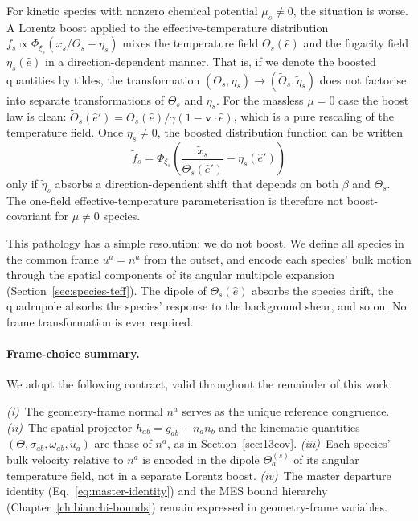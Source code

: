 For kinetic species with nonzero chemical potential
$\mu_s \neq 0$, the situation is worse.  A Lorentz boost
applied to the effective-temperature distribution
$f_s \propto \Phi_{\xi_s}(x_s/\Theta_s - \eta_s)$
mixes the temperature field $\Theta_s(\hat{e})$ and the
fugacity field $\eta_s(\hat{e})$ in a
direction-dependent manner.  That is, if we denote the
boosted quantities by tildes, the transformation
$(\Theta_s, \eta_s) \to (\tilde{\Theta}_s,
\tilde{\eta}_s)$ does not factorise into separate
transformations of $\Theta_s$ and $\eta_s$.  For the
massless $\mu = 0$ case the boost law is clean:
$\tilde{\Theta}_s(\hat{e}') = \Theta_s(\hat{e})
/\gamma(1 - \mathbf{v} \cdot \hat{e})$, which is a pure
rescaling of the temperature field.  Once $\eta_s \neq 0$,
the boosted distribution function can be written
\begin{equation}\label{eq:boost-pathology}
\tilde{f}_s
= \Phi_{\xi_s}\!\left(
  \frac{\tilde{x}_s}{\tilde{\Theta}_s(\hat{e}')}
  - \tilde{\eta}_s(\hat{e}')
\right)
\end{equation}
only if $\tilde{\eta}_s$ absorbs a direction-dependent
shift that depends on both $\beta$ and $\Theta_s$.  The
one-field effective-temperature parameterisation is
therefore not boost-covariant for $\mu \neq 0$ species.

This pathology has a simple resolution: we do not boost.  We
define all species in the common frame $u^a = n^a$ from the
outset, and encode each species' bulk motion through the
spatial components of its angular multipole expansion
(Section~\ref{sec:species-teff}).  The dipole of
$\Theta_s(\hat{e})$ absorbs the species drift, the
quadrupole absorbs the species' response to the background
shear, and so on.  No frame transformation is ever required.


\paragraph{Frame-choice summary.}

We adopt the following contract, valid throughout the
remainder of this work.

\begin{remark}
\label{rem:frame-contract}
\emph{(i)}~The geometry-frame normal $n^a$ serves as the
unique reference congruence.
\emph{(ii)}~The spatial projector $h_{ab} = g_{ab} + n_a n_b$
and the kinematic quantities
$(\Theta, \sigma_{ab}, \omega_{ab}, \dot{u}_a)$ are those of
$n^a$, as in Section~\ref{sec:13cov}.
\emph{(iii)}~Each species' bulk velocity relative to $n^a$
is encoded in the dipole $\Theta^{(s)}_a$ of its angular
temperature field, not in a separate Lorentz boost.
\emph{(iv)}~The master departure identity
(Eq.~\ref{eq:master-identity}) and the MES bound hierarchy
(Chapter~\ref{ch:bianchi-bounds}) remain expressed in
geometry-frame variables.
\end{remark}

